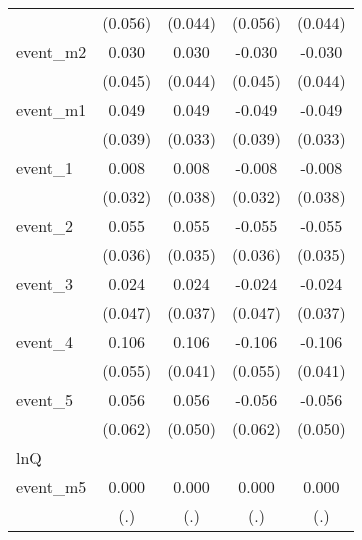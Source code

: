 {\begin{tabular}{l*{4}{c}}
            &     (0.056)         &     (0.044)         &     (0.056)         &     (0.044)         \\
[1em]
event\_m2    &       0.030         &       0.030         &      -0.030         &      -0.030         \\
            &     (0.045)         &     (0.044)         &     (0.045)         &     (0.044)         \\
[1em]
event\_m1    &       0.049         &       0.049         &      -0.049         &      -0.049         \\
            &     (0.039)         &     (0.033)         &     (0.039)         &     (0.033)         \\
[1em]
event\_1     &       0.008         &       0.008         &      -0.008         &      -0.008         \\
            &     (0.032)         &     (0.038)         &     (0.032)         &     (0.038)         \\
[1em]
event\_2     &       0.055         &       0.055         &      -0.055         &      -0.055         \\
            &     (0.036)         &     (0.035)         &     (0.036)         &     (0.035)         \\
[1em]
event\_3     &       0.024         &       0.024         &      -0.024         &      -0.024         \\
            &     (0.047)         &     (0.037)         &     (0.047)         &     (0.037)         \\
[1em]
event\_4     &       0.106         &       0.106\sym{**} &      -0.106         &      -0.106\sym{**} \\
            &     (0.055)         &     (0.041)         &     (0.055)         &     (0.041)         \\
[1em]
event\_5     &       0.056         &       0.056         &      -0.056         &      -0.056         \\
            &     (0.062)         &     (0.050)         &     (0.062)         &     (0.050)         \\
\hline
lnQ         &                     &                     &                     &                     \\
event\_m5    &       0.000         &       0.000         &       0.000         &       0.000         \\
            &         (.)         &         (.)         &         (.)         &         (.)         \\

\end{tabular}}
